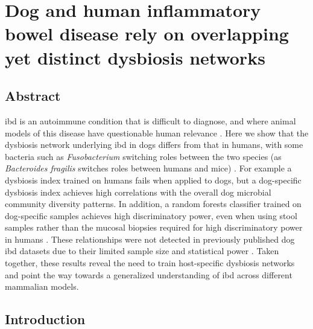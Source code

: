\glsresetall

\section{Dog and human inflammatory bowel disease rely on overlapping yet distinct dysbiosis networks}

\subsection{Abstract}

\Gls{ibd} is an autoimmune condition that is difficult to diagnose, and where animal models of this disease have questionable human relevance \cite{RN17324}. Here we show that the dysbiosis network underlying \gls{ibd} in dogs differs from that in humans, with some bacteria such as \textit{Fusobacterium} switching roles between the two species (as \textit{Bacteroides fragilis} switches roles between humans and mice) \cite{RN154}. For example a dysbiosis index trained on humans fails when applied to dogs, but a dog-specific dysbiosis index achieves high correlations with the overall dog microbial community diversity patterns. In addition, a random forests classifier trained on dog-specific samples achieves high discriminatory power, even when using stool samples rather than the mucosal biopsies required for high discriminatory power in humans \cite{RN154}. These relationships were not detected in previously published dog \gls{ibd} datasets due to their limited sample size and statistical power \cite{RN147}. Taken together, these results reveal the need to train host-specific dysbiosis networks and point the way towards a generalized understanding of \gls{ibd} across different mammalian models.

\subsection{Introduction}

